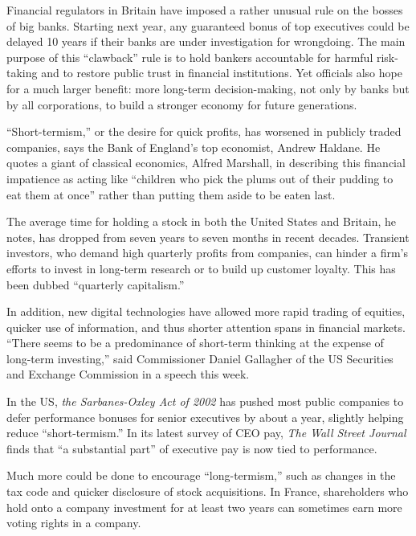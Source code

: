 Financial regulators in Britain have imposed a rather unusual rule
on the bosses of big banks. Starting next year, any guaranteed bonus of
top executives could be delayed 10 years if their banks are under
investigation for wrongdoing. The main purpose of this ``clawback'' rule
is to hold bankers accountable for harmful risk-taking and to restore
public trust in financial institutions. Yet officials also hope for a
much larger benefit: more long-term decision-making, not only by banks
but by all corporations, to build a stronger economy for future
generations. 

``Short-termism,'' or the desire for quick profits,
has worsened in publicly traded companies, says the Bank of England's
top economist, Andrew Haldane. He quotes a giant of classical economics,
Alfred Marshall, in describing this financial impatience as acting like
``children who pick the plums out of their pudding to eat them at once''
rather than putting them aside to be eaten last. 



The average time
for holding a stock in both the United States and Britain, he notes, has
dropped from seven years to seven months in recent decades. Transient
investors, who demand high quarterly profits from companies, can hinder
a firm's efforts to invest in long-term research or to build up customer
loyalty. This has been dubbed ``quarterly capitalism.'' 


In addition, new digital technologies have allowed more rapid trading of
equities, quicker use of information, and thus shorter attention spans
in financial markets. ``There seems to be a predominance of short-term
thinking at the expense of long-term investing,'' said Commissioner
Daniel Gallagher of the US Securities and Exchange Commission in a
speech this week. 


In the US, \emph{the Sarbanes-Oxley Act of 2002} has
pushed most public companies to defer performance bonuses for senior
executives by about a year, slightly helping reduce ``short-termism.''
In its latest survey of CEO pay, \emph{The Wall Street Journal} finds that ``a
substantial part'' of executive pay is now tied to performance.




Much more could be done to encourage ``long-termism,'' such as
changes in the tax code and quicker disclosure of stock acquisitions. In
France, shareholders who hold onto a company investment for at least two
years can sometimes earn more voting rights in a company. 


